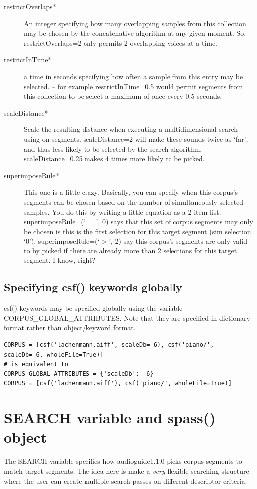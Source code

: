\documentclass{article}
\newcommand{\ag}{audioguide1.1.0\xspace}
\begin{document}
\begin{spacing}{1.2}
\begin{description}
\item[restrictOverlaps*] An integer specifying how many overlapping samples from this collection may be chosen by the concatenative algorithm at any given moment.  So, restrictOverlaps=2 only permits 2 overlapping voices at a time.

\item[restrictInTime*] a time in seconds specifying how often a sample from this entry may be selected. -- for example restrictInTime=0.5 would permit segments from this collection to be select a maximum of once every 0.5 seconds.

\item[scaleDistance*] Scale the resulting distance when executing a multidimensional search using on segments.  scaleDistance=2 will make these sounds twice as `far', and thus less likely to be selected by the search algorithm.  scaleDistance=0.25 makes 4 times more likely to be picked.

\item[superimposeRule*]  This one is a little crazy.  Basically, you can specify when this corpus's segments can be chosen based on the number of simultaneously selected samples.  You do this by writing a little equation as a 2-item list.  superimposeRule=(`==', 0) says that this set of corpus segments may only be chosen is this is the first selection for this target segment (sim selection `0').  superimposeRule=(`$>$', 2) say this corpus's segments are only valid to by picked if there are already more than 2 selections for this target segment.  I know, right?
\end{description}


\subsection{Specifying csf() keywords globally}\label{globalcorpus}
csf() keywords may be specified globally using the variable CORPUS\_GLOBAL\_ATTRIBUTES.  Note that they are specified in dictionary format rather than object/keyword format.

\begin{lstlisting}
CORPUS = [csf('lachenmann.aiff', scaleDb=-6), csf('piano/', scaleDb=-6, wholeFile=True)]
# is equivalent to 
CORPUS_GLOBAL_ATTRIBUTES = {'scaleDb': -6}
CORPUS = [csf('lachenmann.aiff'), csf('piano/', wholeFile=True)]
\end{lstlisting}


\section{SEARCH variable and spass() object}
The SEARCH variable specifies how \ag picks corpus segments to match target segments.  The idea here is make a \emph{very} flexible searching structure where the user can create multiple search passes on different descriptor criteria.


\end{spacing}
\end{document}
